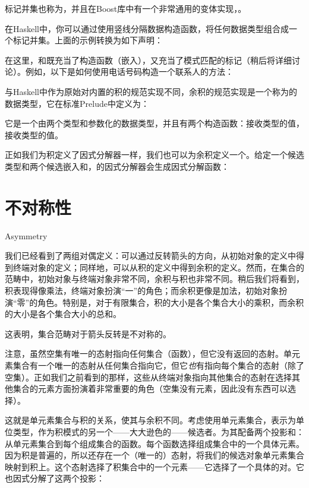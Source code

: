 标记并集也称为，并且在Boost库中有一个非常通用的变体实现，。

在Haskell中，你可以通过使用竖线分隔数据构造函数，将任何数据类型组合成一个标记并集。上面的示例转换为如下声明：

在这里，和既充当了构造函数（嵌入），又充当了模式匹配的标记（稍后将详细讨论）。例如，以下是如何使用电话号码构造一个联系人的方法：

与Haskell中作为原始对内置的积的规范实现不同，余积的规范实现是一个称为的数据类型，它在标准Prelude中定义为：

它是一个由两个类型和参数化的数据类型，并且有两个构造函数：接收类型的值，接收类型的值。

正如我们为积定义了因式分解器一样，我们也可以为余积定义一个。给定一个候选类型和两个候选嵌入和，的因式分解器会生成因式分解函数：


\section{不对称性}{Asymmetry}

我们已经看到了两组对偶定义：可以通过反转箭头的方向，从初始对象的定义中得到终端对象的定义；同样地，可以从积的定义中得到余积的定义。然而，在集合的范畴中，初始对象与终端对象非常不同，余积与积也非常不同。稍后我们将看到，积表现得像乘法，终端对象扮演“一”的角色；而余积更像是加法，初始对象扮演“零”的角色。特别是，对于有限集合，积的大小是各个集合大小的乘积，而余积的大小是各个集合大小的总和。

这表明，集合范畴对于箭头反转是不对称的。

注意，虽然空集有唯一的态射指向任何集合（函数），但它没有返回的态射。单元素集合有一个唯一的态射从任何集合指向它，但它\emph{也}有指向每个集合的态射（除了空集）。正如我们之前看到的那样，这些从终端对象指向其他集合的态射在选择其他集合的元素方面扮演着非常重要的角色（空集没有元素，因此没有东西可以选择）。

这就是单元素集合与积的关系，使其与余积不同。考虑使用单元素集合，表示为单位类型\code{()}，作为积模式的另一个——大大逊色的——候选者。为其配备两个投影和：从单元素集合到每个组成集合的函数。每个函数选择组成集合中的一个具体元素。因为积是普遍的，所以还存在一个（唯一的）态射，将我们的候选对象单元素集合映射到积上。这个态射选择了积集合中的一个元素——它选择了一个具体的对。它也因式分解了这两个投影：

